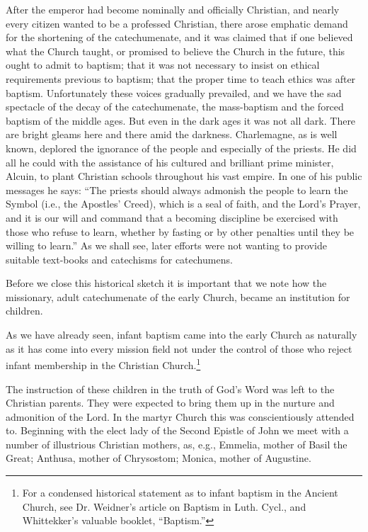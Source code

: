 After the emperor had become nominally and officially Christian, and nearly every citizen wanted to be a professed Christian, there arose emphatic demand for the shortening of the catechumenate, and it was claimed that if one believed what the Church taught, or promised to believe the Church in the future, this ought to admit to baptism; that it was not necessary to insist on ethical requirements previous to baptism; that the proper time to teach ethics was after baptism. Unfortunately these voices gradually prevailed, and we have the sad spectacle of the decay of the catechumenate, the mass-baptism and the forced baptism of the middle ages. But even in the dark ages it was not all dark. There are
bright gleams here and there amid the darkness.  Charlemagne, as is well known, deplored the ignorance of the people and especially of the priests. He did all he could with the assistance of his cultured and brilliant prime minister, Alcuin, to plant Christian schools throughout his vast empire. In one of his public messages he says: “The priests should always admonish the people to learn the Symbol (i.e., the Apostles’ Creed), which is a seal of faith, and the Lord’s Prayer, and it is our will and command that a becoming discipline be exercised with those who refuse to learn, whether by fasting or by other penalties until they be willing to learn.” As we shall see, later efforts were not wanting to provide suitable text-books and catechisms for catechumens.

 Before we close this historical sketch it is important that we note how the missionary, adult catechumenate of the early Church, became an institution for children.

As we have already seen, infant baptism came into the early Church as naturally as it has come into every mission field not under the control of those who reject infant membership in the Christian Church.\footnote{For a condensed historical statement as to infant baptism in the Ancient Church, see Dr. Weidner’s article on Baptism in Luth. Cycl., and Whittekker’s valuable booklet, “Baptism.”}

The instruction of these children in the truth of
God’s Word was left to the Christian parents. They were expected to bring them up in the nurture and admonition of the Lord. In the martyr Church this was conscientiously attended to. Beginning with the elect lady of the Second Epistle of John we meet with a number of illustrious Christian mothers, as, e.g., Emmelia, mother of Basil the Great; Anthusa, mother of Chrysostom; Monica, mother of Augustine.

